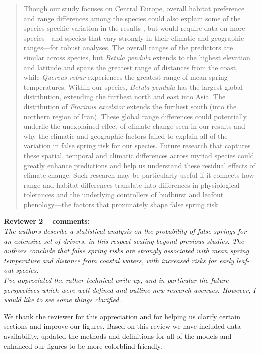 \documentclass[11pt,a4paper]{article}
\begin{document}
\begin{quotation}
\noindent  Though our study focuses on Central Europe, overall habitat preference and range differences among the species could also explain some of the species-specific variation in the results \citep{Chuine2001}, but would require data on more species---and species that vary strongly in their climatic and geographic ranges---for robust analyses. The overall ranges of the predictors are similar across species, but \textit{Betula pendula} extends to the highest elevation and latitude and spans the greatest range of distances from the coast, while \textit{Quercus robur} experiences the greatest range of mean spring temperatures. Within our species, \textit{Betula pendula} has the largest global distribution, extending the furthest north and east into Asia. The distribution of \textit{Fraxinus excelsior} extends the furthest south (into the northern region of Iran). These global range differences could potentially underlie the unexplained effect of climate change seen in our results and why the climatic and geographic factors failed to explain all of the variation in false spring risk for our species. Future research that captures these spatial, temporal and climatic differences across myriad species could greatly enhance predictions and help us understand these residual effects of climate change. Such research may be particularly useful if it connects how range and habitat differences translate into differences in physiological tolerances and the underlying controllers of budburst and leafout phenology---the factors that proximately shape false spring risk. 
\end{quotation}


\textbf {Reviewer 2 -- comments:} \\


\textit{The authors describe a statistical analysis on the probability of false springs for an extensive set of drivers, in this respect scaling beyond previous studies. The authors conclude that false spring risks are strongly associated with mean spring temperature and distance from coastal waters, with increased risks for early leaf-out species. \\

I've appreciated the rather technical write-up, and in particular the future perspectives which were well defined and outline new research avenues. However, I would like to see some things clarified.}

We thank the reviewer for this appreciation and for helping us clarify certain sections and improve our figures. Based on this review we have included data availability, updated the methods and definitions for all of the models and enhanced our figures to be more colorblind-friendly. 
\end{document}
